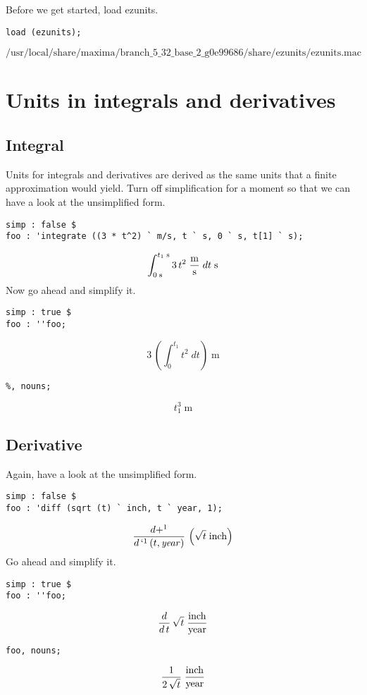 \documentclass[12pt]{article}
\begin{document}
Before we get started, load ezunits.
\begin{verbatim}
load (ezunits);
\end{verbatim}
$$
 \mbox{{}/usr/local/share/maxima/branch\_5\_32\_base\_2\_g0e99686/share/ezunits/ezunits.mac{}}$$
\section{Units in integrals and derivatives
}
\subsection{Integral
}
Units for integrals and derivatives are derived as the same units that a finite approximation would yield.
Turn off simplification for a moment so that we can have a look at the unsimplified form.
\begin{verbatim}
simp : false $
foo : 'integrate ((3 * t^2) ` m/s, t ` s, 0 ` s, t[1] ` s);
\end{verbatim}
$$\int_{0\;\mathrm{s}}^{t_{1}\;\mathrm{s}}{3\,t^2\;{{\mathrm{m}
 }\over{\mathrm{s}}}\;dt\;\mathrm{s}}$$
Now go ahead and simplify it.
\begin{verbatim}
simp : true $
foo : ''foo;
\end{verbatim}
$$3\,\left(\int_{0}^{t_{1}}{t^2\;dt}\right)\;\mathrm{m}$$
\begin{verbatim}
%, nouns;
\end{verbatim}
$$t_{1}^3\;\mathrm{m}$$
\subsection{Derivative
}
Again, have a look at the unsimplified form.
\begin{verbatim}
simp : false $
foo : 'diff (sqrt (t) ` inch, t ` year, 1);
\end{verbatim}
$${{d+^{1}}\over{d\,`^1\left(t , {\it year}\right)}}\,\left(\sqrt{t}
 \;\mathrm{inch}\right)$$
Go ahead and simplify it.
\begin{verbatim}
simp : true $
foo : ''foo;
\end{verbatim}
$${{d}\over{d\,t}}\,\sqrt{t}\;{{\mathrm{inch}}\over{\mathrm{year}}}$$
\begin{verbatim}
foo, nouns;
\end{verbatim}
$${{1}\over{2\,\sqrt{t}}}\;{{\mathrm{inch}}\over{\mathrm{year}}}$$
\end{document}
